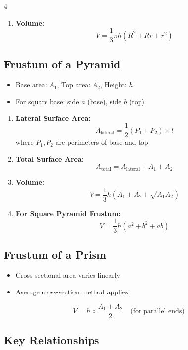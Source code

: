 \begin{multicols*}{4}
\begin{enumerate}
    \item \textbf{Volume:}
          \[ V = \frac{1}{3}\pi h (R^2 + Rr + r^2) \]
\end{enumerate}

\subsection*{Frustum of a Pyramid}

\begin{itemize}
    \item Base area: $A_1$, Top area: $A_2$, Height: $h$
    \item For square base: side $a$ (base), side $b$ (top)
\end{itemize}

\begin{enumerate}
    \item \textbf{Lateral Surface Area:}
          \[ A_{\text{lateral}} = \frac{1}{2}(P_1 + P_2) \times l \]
          where $P_1, P_2$ are perimeters of base and top
    
    \item \textbf{Total Surface Area:}
          \[ A_{\text{total}} = A_{\text{lateral}} + A_1 + A_2 \]
    
    \item \textbf{Volume:}
          \[ V = \frac{1}{3}h (A_1 + A_2 + \sqrt{A_1 A_2}) \]
    
    \item \textbf{For Square Pyramid Frustum:}
          \[ V = \frac{1}{3}h (a^2 + b^2 + ab) \]
\end{enumerate}

\subsection*{Frustum of a Prism}

\begin{itemize}
    \item Cross-sectional area varies linearly
    \item Average cross-section method applies
\end{itemize}

\[ V = h \times \frac{A_1 + A_2}{2} \quad \text{(for parallel ends)} \]

\subsection*{Key Relationships}


\end{multicols*}
